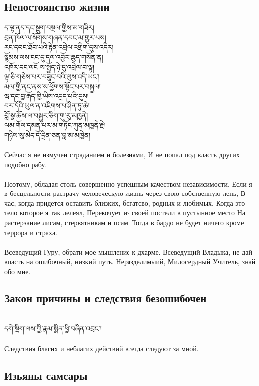 \subsection{Непостоянство жизни}
\ti
ད་ལྟ་ནད་དང་སྡུག་བསྔལ་གྱིས་མ་གཟིར།\\
བྲན་ཁོལ་ལ་སོགས་གཞན་དབང་མ་གྱུར་པས།\\
རང་དབང་ཐོབ་པའི་རྟེན་འབྲེལ་འགྲིག་དུས་འདིར།\\
སྙོམས་ལས་ངང་དུ་དལ་འབྱོར་ཆུད་གསོན་ན།\\
འཁོར་དང་ལངོ ས་སྤྱོད་ཉེ་དུ་འབྲེལ་བ་ལྟ།\\
ལྟ་ཅི་གཅེས་པར་བཟུང་བའི་ལུས་འདི་ཡང་།\\
མལ་གྱི་ནང་ནས་ས་ཕྱོགས་སྟོང་པར་བསྐྱལ།\\
ཝ་དང་བྱ་རྒོད་ཁྱི་ཡིས་འདྲད་པའི་དུས།\\
བར་དོའི་ཡུལ་ན་འཇིགས་པ་ཤིན་ཏུ་ཆེ།\\
བློ་སྣ་ཆོས་ལ་བསྒྱུར་ཅིག་གུ་རུ་མཁྱནེ།\\
ལམ་གོལ་དམན་པར་མ་གཏོང་ཀུན་མཁྱནེ་རྗེ།\\
གཉིས་སུ་མེད་དོ་དྲིན་ཅན་བླ་མ་མཁྱེན།\\
\\
\ru
Сейчас я не измучен страданием и болезнями,
И не попал под власть других подобно рабу.\\
\\
Поэтому, обладая столь совершенно-успешным качеством не\-зависимости,
Если я в бесцельности растрачу человеческую жи\-знь через свою собственную лень,
В час, когда придется оста\-вить близких, богатсво, родных и любимых,
Когда это тело которое я так лелеял,
Перекочует из своей постели в пустынное место
На растерзание лисам, стервятникам и псам,
Тогда в бардо не будет ничего кроме террора и страха.\\
\\
Всеведущий Гуру, обрати мое мышление к дхарме.
Всеведущий Владыка, не дай впасть на ошибочный, низкий путь.
Нераздели\-мыий, Милосердный Учитель, знай обо мне.

\newpage
\subsection{Закон причины и следствия безошибочен}
\\
\ti
དགེ་སྡིག་ལས་ཀྱི་རྣམ་སྨིན་ཕྱི་བཞིན་འབྲང་།\\
\\
\ru
Следствия благих и неблагих действий всегда следуют за мной.

\subsection{Изьяны самсары}

